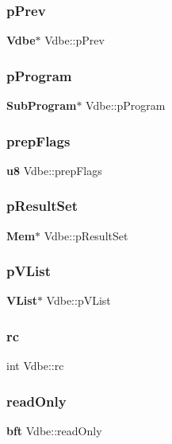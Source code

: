 \subsubsection{pPrev}
{\footnotesize\ttfamily \textbf{ Vdbe}$\ast$ Vdbe\+::p\+Prev}

\mbox{\label{struct_vdbe_a9239ea72573142101328be15c90de62b}} 
\subsubsection{pProgram}
{\footnotesize\ttfamily \textbf{ Sub\+Program}$\ast$ Vdbe\+::p\+Program}

\mbox{\label{struct_vdbe_ad4dd5002743d865c7ad448b13ba49b04}} 
\subsubsection{prepFlags}
{\footnotesize\ttfamily \textbf{ u8} Vdbe\+::prep\+Flags}

\mbox{\label{struct_vdbe_a0dec47b8d8c481df2b73d5bbf9cdde11}} 
\subsubsection{pResultSet}
{\footnotesize\ttfamily \textbf{ Mem}$\ast$ Vdbe\+::p\+Result\+Set}

\mbox{\label{struct_vdbe_a4676092811a564b044383fe23c687429}} 
\subsubsection{pVList}
{\footnotesize\ttfamily \textbf{ V\+List}$\ast$ Vdbe\+::p\+V\+List}

\mbox{\label{struct_vdbe_af82fb0227a5b8db9d3b9bdb03964a4a0}} 
\subsubsection{rc}
{\footnotesize\ttfamily int Vdbe\+::rc}

\mbox{\label{struct_vdbe_accc1c66c5ff9524a8ad3051d754e798c}} 
\subsubsection{readOnly}
{\footnotesize\ttfamily \textbf{ bft} Vdbe\+::read\+Only}

